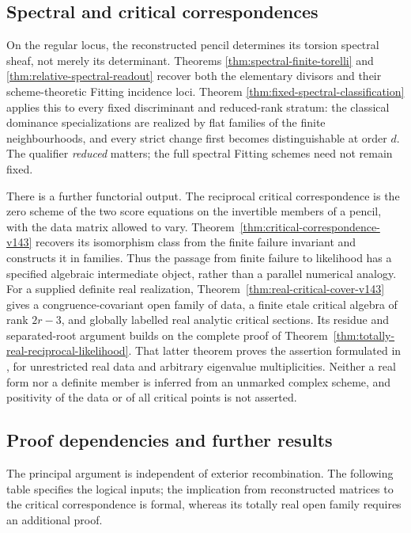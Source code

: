 \subsection{Spectral and critical correspondences}
On the regular locus, the reconstructed pencil determines its torsion
spectral sheaf, not merely its determinant.  Theorems
\ref{thm:spectral-finite-torelli} and
\ref{thm:relative-spectral-readout} recover both the elementary
divisors and their scheme-theoretic Fitting incidence loci.  Theorem
\ref{thm:fixed-spectral-classification} applies this to every fixed
discriminant and reduced-rank stratum: the classical dominance
specializations are realized by flat families of the finite
neighbourhoods, and every strict change first becomes distinguishable
at order \(d\).  The qualifier \emph{reduced} matters; the full
spectral Fitting schemes need not remain fixed.

There is a further functorial output.  The reciprocal critical
correspondence is the zero scheme of the two score equations on the
invertible members of a pencil, with the data matrix allowed to vary.
Theorem~\ref{thm:critical-correspondence-v143} recovers its isomorphism
class from the finite failure invariant and constructs it in families.
Thus the passage from finite failure to likelihood has a specified
algebraic intermediate object, rather than a parallel numerical
analogy.  For a supplied definite real realization,
Theorem~\ref{thm:real-critical-cover-v143} gives a congruence-covariant
open family of data, a finite etale critical algebra of rank \(2r-3\),
and globally labelled real analytic critical sections.  Its residue
and separated-root argument builds on the complete proof of
Theorem~\ref{thm:totally-real-reciprocal-likelihood}.  That latter
theorem proves the assertion formulated in
\cite[Conjecture~4.5]{FevolaMandelshtamSturmfels}, for unrestricted
real data and arbitrary eigenvalue multiplicities.  Neither a real
form nor a definite member is inferred from an unmarked complex
scheme, and positivity of the data or of all critical points is not
asserted.

\subsection{Proof dependencies and further results}
The principal argument is independent of exterior recombination.
The following table specifies the logical inputs; the implication
from reconstructed matrices to the critical correspondence is formal,
whereas its totally real open family requires an additional proof.

